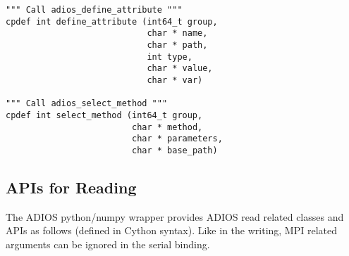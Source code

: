 \begin{lstlisting}[language=cython,caption={Functions for writing and No-XML},label={},]
""" Call adios_define_attribute """
cpdef int define_attribute (int64_t group,
                            char * name,
                            char * path,
                            int type,
                            char * value,
                            char * var)

""" Call adios_select_method """
cpdef int select_method (int64_t group,
                         char * method,
                         char * parameters,
                         char * base_path)
\end{lstlisting}

\subsection{APIs for Reading}
The ADIOS python/numpy wrapper provides ADIOS read related classes and APIs as follows (defined in Cython syntax). Like in the writing, MPI related arguments can be ignored in the serial binding.
